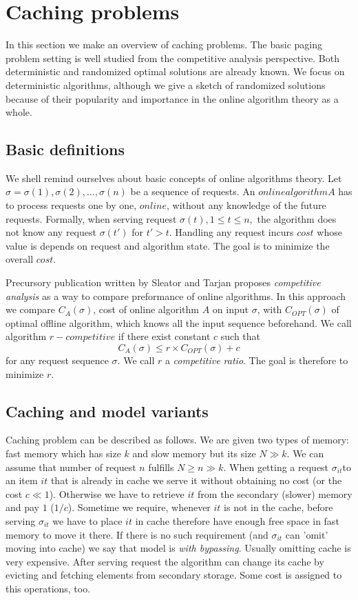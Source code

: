 \section{Caching problems}
In this section we make an overview of caching problems. The basic paging 
problem setting is well studied from the competitive analysis perspective. 
Both deterministic and randomized optimal solutions are already known. We focus 
on deterministic algorithms, although we give a sketch of randomized solutions 
because of their popularity and importance in the online algorithm theory as a 
whole. 
\subsection{Basic definitions}
We shell remind ourselves about basic concepts of online algorithms theory. 
Let $\sigma = \sigma(1), \sigma(2), \ldots, \sigma(n)$ be a sequence of 
requests. An $online algorithm A$ has to process requests one by one, $online$, 
without any knowledge of the future requests. Formally, when serving request 
$\sigma(t), 1 \leq t \leq n,$ the algorithm does not know any request 
$\sigma(t')$ for $t'>t$. Handling any request incurs $cost$ whose value is 
depends on request and algorithm state. The goal is to minimize the overall 
$cost$.

Precursory publication written by Sleator and Tarjan proposes 
\textit{competitive analysis} as a way to compare preformance of online 
algorithms. In this approach we compare $C_A(\sigma)$, cost of online algorithm 
$A$ on input $\sigma$, with $C_{OPT}(\sigma)$ of optimal offline algorithm, 
which knows all the input sequence beforehand. We call algorithm $r-competitive$ 
if there exist constant $c$ such that
$$C_A(\sigma) \leq r \times C_{OPT}(\sigma) + c$$
for any request sequence $\sigma$. We call $r$ a \textit{competitive ratio}. 
The goal is therefore to minimize $r$.

\subsection{Caching and model variants}
Caching problem can be described as follows. We are given two types of memory: 
fast memory which has size $k$ and slow memory but its size $N \gg k$. We can 
assume that number of request $n$ fulfills $N \geq n \gg k$. When getting a 
request $\sigma_{it}$to an item $it$ that is already in cache we serve it 
without obtaining no cost (or the cost $c \ll 1$). 
Otherwise we have to retrieve $it$ from the secondary (slower) memory and pay 
$1$ ($1/c$). Sometime we require, whenever $it$ is not in the cache, before 
serving $\sigma_{it}$ we have to place $it$ in cache therefore have enough 
free space in fast memory to move it there. If there is no such requirement 
(and $\sigma_{it}$ can 'omit' moving into cache) we say that model is 
\textit{with bypassing}. Usually omitting cache is very expensive. After serving 
request the algorithm can change its cache by evicting and fetching elements 
from secondary storage. Some cost is assigned to this operations, too.

